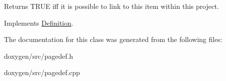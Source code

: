 Returns T\+R\+UE iff it is possible to link to this item within this project. 

Implements \mbox{\hyperlink{class_definition_a845891c7206d40c3664b562636cdf9fc}{Definition}}.



The documentation for this class was generated from the following files\+:\begin{DoxyCompactItemize}
\item 
doxygen/src/pagedef.\+h\item 
doxygen/src/pagedef.\+cpp\end{DoxyCompactItemize}
